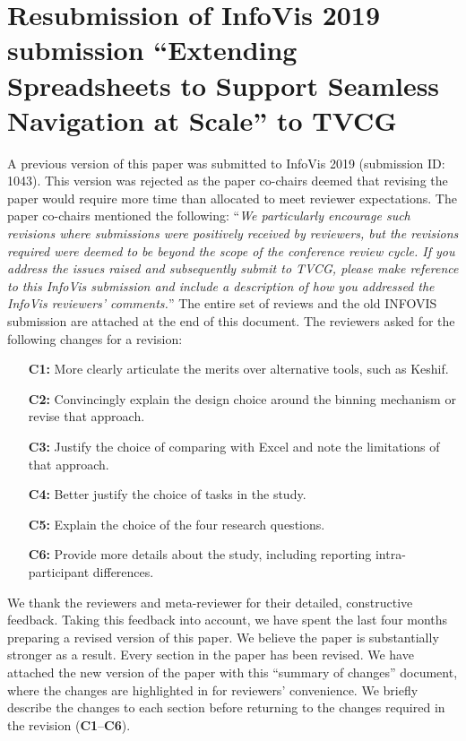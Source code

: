 

\section*{Resubmission of InfoVis 2019 submission ``Extending Spreadsheets to Support Seamless
Navigation at Scale'' to TVCG}

A previous version of this paper was submitted to InfoVis 2019 (submission ID: 1043). This version was rejected as the paper co-chairs deemed that revising the paper would require more time than allocated to meet reviewer expectations. The paper co-chairs mentioned the following: ``\textit{We particularly encourage such revisions where submissions were positively received by reviewers, but the revisions required were deemed to be beyond the scope of the conference review cycle. If you address the issues raised and subsequently submit to TVCG, please make reference to this InfoVis submission and include a description of how you addressed the InfoVis reviewers' comments.}'' The entire set of reviews and the old INFOVIS submission are attached  at the end of this document. The reviewers asked for the following changes for a revision: 
\begin{itemize}
    \item[\textbf{C1:}] More clearly articulate the merits over alternative tools, such as Keshif. 
     \item[\textbf{C2:}] Convincingly explain the design choice around the binning mechanism or revise
    that approach.
    \item[\textbf{C3:}] Justify the choice of comparing with Excel and note the limitations of that
    approach.
     \item[\textbf{C4:}] Better justify the choice of tasks in the study. 
     \item[\textbf{C5:}] Explain the choice of the four research questions.
     \item[\textbf{C6:}] Provide more details about the study, including reporting intra-participant
    differences.
\end{itemize} 
We thank the reviewers and meta-reviewer for their detailed,
constructive feedback. 
Taking this feedback into account, 
we have spent the last four months 
preparing a revised version of this paper.
We believe the paper is substantially
stronger as a result. 
Every section in the paper has been revised. We have attached the new version of the paper with this ``summary of changes'' document, where
the changes are highlighted in  for reviewers' convenience.
We briefly describe the changes to each section
before returning to the changes required in the revision 
({\bf C1}--{\bf C6}).

